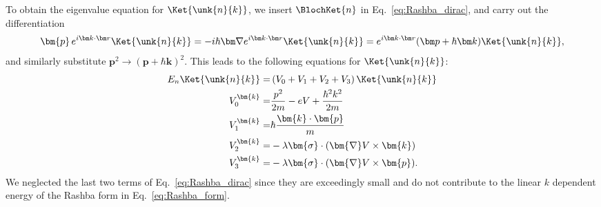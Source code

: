 To obtain the eigenvalue equation for $\Ket{\unk{n}{k}}$, we insert $\BlochKet{n}$ in Eq.~\eqref{eq:Rashba_dirac}, and carry out the differentiation
\begin{equation}
	\label{eq:Rashba_momentum}
\bm{p} \, \Eikr\Ket{\unk{n}{k}} = -i \hbar \bm \nabla \Eikr\Ket{\unk{n}{k}} = \Eikr(\bm p + \hbar \bm k)\Ket{\unk{n}{k}},
\end{equation}
and similarly substitute $\bm{p}^2 \rightarrow (\bm{p}+\hbar \bm{k})^2$.
This leads to the following equations for $\Ket{\unk{n}{k}}$:
\begin{align}
	\label{eq:Rashba_unk_Vs}
	E_n \Ket{\unk{n}{k}} =& \left(V_0 + V_1  +  V_2 + V_3 \right) \Ket{\unk{n}{k}} \\
	V_0^{\bm{k}} =& \frac{p^2}{2m} - eV + \frac{\hbar^2 k^2}{2m} \\
	V_1^{\bm{k}} =& \hbar\frac{\bm{k}\cdot\bm{p}}{m} \\
	V_2^{\bm{k}} =& -\lambda \bm{\sigma} \cdot ( \bm{\nabla}V \times \bm{k}) \\
	V_3^{\bm{k}} =& -\lambda \bm{\sigma} \cdot ( \bm{\nabla}V \times \bm{p}).
\end{align}
We neglected the last two terms of Eq.~\eqref{eq:Rashba_dirac} since they are exceedingly small and do not contribute to the linear $k$ dependent energy of the Rashba form in Eq.~\eqref{eq:Rashba_form}.

